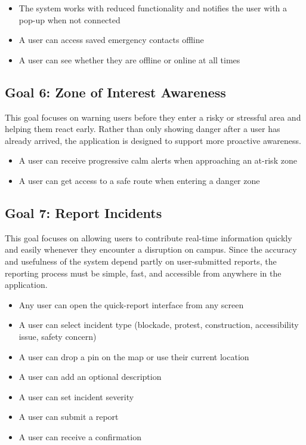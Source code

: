 \documentclass[sigconf]{acmart}
\begin{document}
\begin{itemize}[leftmargin=*, labelindent=0pt, itemsep=2pt]
    \item The system works with reduced functionality and notifies the user with a pop-up when not connected
    \item A user can access saved emergency contacts offline
    \item A user can see whether they are offline or online at all times
\end{itemize}
 
\subsection{Goal 6: Zone of Interest Awareness}
This goal focuses on warning users before they enter a risky or stressful area and helping them react early. Rather than only showing danger after a user has already arrived, the application is designed to support more proactive awareness.
 
\begin{itemize}[leftmargin=*, labelindent=0pt, itemsep=2pt]
    \item A user can receive progressive calm alerts when approaching an at-risk zone
    \item A user can get access to a safe route when entering a danger zone
\end{itemize}
 
\subsection{Goal 7: Report Incidents}
This goal focuses on allowing users to contribute real-time information quickly and easily whenever they encounter a disruption on campus. Since the accuracy and usefulness of the system depend partly on user-submitted reports, the reporting process must be simple, fast, and accessible from anywhere in the application.
 
\begin{itemize}[leftmargin=*, labelindent=0pt, itemsep=2pt]
    \item Any user can open the quick-report interface from any screen
    \item A user can select incident type (blockade, protest, construction, accessibility issue, safety concern)
    \item A user can drop a pin on the map or use their current location
    \item A user can add an optional description
    \item A user can set incident severity
    \item A user can submit a report
    \item A user can receive a confirmation
\end{itemize}
 
\end{document}
